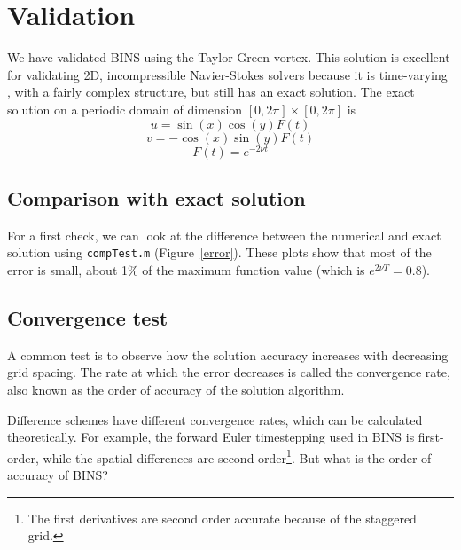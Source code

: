 \documentclass[12pt]{article}
\begin{document}
\section{Validation}
We have validated BINS using the Taylor-Green vortex.  This solution is excellent for validating 2D, incompressible Navier-Stokes solvers because it is time-varying , with a fairly complex structure, but still has an exact solution.  
The exact solution on a periodic domain of dimension $[0,2\pi] \times [0,2\pi]$ is
\[ u=\sin (x) \cos (y) F(t)\]
\[ v=-\cos (x) \sin (y) F(t)\]
\[ F(t)=e^{-2\nu t}\]

\subsection{Comparison with exact solution}
For a first check, we can look at the difference between the numerical and exact solution using \texttt{compTest.m} (Figure~\ref{error}).  These plots show that most of the error is small, about 1\% of the maximum function value (which is $e^{2\nu T}=0.8$).

\begin{center}
\begin{figure*}
\center
{}  
\caption{Absolute error at $t=1$ on a grid of size $N=70$.}
\label{error}
\end{figure*}
\end{center}

\subsection{Convergence test}
A common test is to observe how the solution accuracy increases with decreasing grid spacing.  The rate at which the error decreases is called the convergence rate, also known as the order of accuracy of the solution algorithm.  

Difference schemes have different convergence rates, which can be calculated theoretically.  For example, the forward Euler timestepping used in BINS is first-order, while the spatial differences are second order\footnote{The first derivatives are second order accurate because of the staggered grid.}.  But what is the order of accuracy of BINS?
\end{document}
